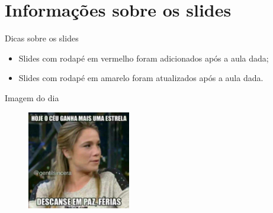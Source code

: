 \documentclass{beamer}
\begin{document}
\section{Informações sobre os slides}

\begin{frame}[fragile]{Dicas sobre os slides}
      
      \begin{itemize}
            \item Slides com rodapé em vermelho foram adicionados após a aula dada;
            \item Slides com rodapé em amarelo foram atualizados  após a aula dada.
      \end{itemize}
\end{frame}

\begin{frame}[fragile]{Imagem do dia}

        \begin{figure}[H]
            \centerline{\includegraphics[width=0.4\textwidth]{assets/imagem-do-dia/ferias_acabou.jpg}}
            
        \end{figure}
\end{frame}


\footlinecolor{}



\backmatter
\end{document}
